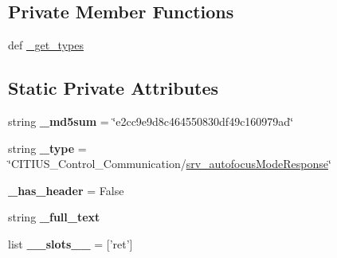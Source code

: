 \subsection*{\-Private \-Member \-Functions}
\begin{DoxyCompactItemize}
\item 
def \hyperlink{class_c_i_t_i_u_s___control___communication_1_1srv_1_1__srv__autofocus_mode_1_1srv__autofocus_mode_response_ad82f9ab0783304f5e91c4d1cbff4dad2}{\-\_\-get\-\_\-types}
\end{DoxyCompactItemize}
\subsection*{\-Static \-Private \-Attributes}
\begin{DoxyCompactItemize}
\item 
\hypertarget{class_c_i_t_i_u_s___control___communication_1_1srv_1_1__srv__autofocus_mode_1_1srv__autofocus_mode_response_a34a26f62cc9440c18edb42d81f88c6b9}{string {\bfseries \-\_\-md5sum} = \char`\"{}e2cc9e9d8c464550830df49c160979ad\char`\"{}}\label{class_c_i_t_i_u_s___control___communication_1_1srv_1_1__srv__autofocus_mode_1_1srv__autofocus_mode_response_a34a26f62cc9440c18edb42d81f88c6b9}

\item 
\hypertarget{class_c_i_t_i_u_s___control___communication_1_1srv_1_1__srv__autofocus_mode_1_1srv__autofocus_mode_response_af8434537e5fcd35586bf8910f96ce14f}{string {\bfseries \-\_\-type} = \char`\"{}\-C\-I\-T\-I\-U\-S\-\_\-\-Control\-\_\-\-Communication/\hyperlink{class_c_i_t_i_u_s___control___communication_1_1srv_1_1__srv__autofocus_mode_1_1srv__autofocus_mode_response}{srv\-\_\-autofocus\-Mode\-Response}\char`\"{}}\label{class_c_i_t_i_u_s___control___communication_1_1srv_1_1__srv__autofocus_mode_1_1srv__autofocus_mode_response_af8434537e5fcd35586bf8910f96ce14f}

\item 
\hypertarget{class_c_i_t_i_u_s___control___communication_1_1srv_1_1__srv__autofocus_mode_1_1srv__autofocus_mode_response_ae9b0c1b90f4a4fd8f8bdd54035e75588}{{\bfseries \-\_\-has\-\_\-header} = \-False}\label{class_c_i_t_i_u_s___control___communication_1_1srv_1_1__srv__autofocus_mode_1_1srv__autofocus_mode_response_ae9b0c1b90f4a4fd8f8bdd54035e75588}

\item 
string {\bfseries \-\_\-full\-\_\-text}
\item 
\hypertarget{class_c_i_t_i_u_s___control___communication_1_1srv_1_1__srv__autofocus_mode_1_1srv__autofocus_mode_response_a2780c14a16455693633ecc54e6deffc0}{list {\bfseries \-\_\-\-\_\-slots\-\_\-\-\_\-} = \mbox{[}'ret'\mbox{]}}\label{class_c_i_t_i_u_s___control___communication_1_1srv_1_1__srv__autofocus_mode_1_1srv__autofocus_mode_response_a2780c14a16455693633ecc54e6deffc0}


\end{DoxyCompactItemize}
